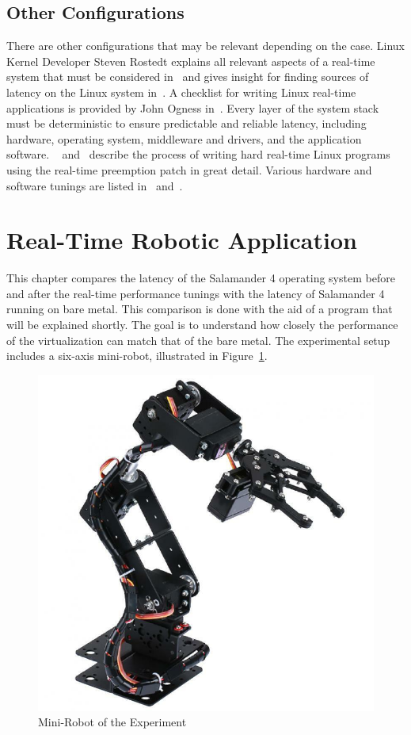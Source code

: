 \documentclass[MMR,Master,english]{style/twbook}
\begin{document}
\subsection{Other Configurations}
There are other configurations that may be relevant depending on the case. Linux Kernel Developer Steven Rostedt explains all relevant aspects of a real-time system that must be considered in~\cite{kernelrecipesKernelRecipes20162016} and gives insight for finding sources of latency on the Linux system in~\cite{thelinuxfoundationFindingSourcesLatency2020}. A checklist for writing Linux real-time applications is provided by John Ogness in~\cite{thelinuxfoundationChecklistWritingLinux2020}. Every layer of the system stack must be deterministic to ensure predictable and reliable latency, including hardware, operating system, middleware and drivers, and the application software. ~\cite{HOWTOBuildRTapplication} and~\cite{RealtimeProgrammingLinux} describe the process of writing hard real-time Linux programs using the real-time preemption patch in great detail. Various hardware and software tunings are listed in~\cite{KVMQemuVirtualization} and~\cite{RealTimePerformanceTuning2022}.

\clearpage

\section{Real-Time Robotic Application}\label{sec:robotic_application}
This chapter compares the latency of the Salamander 4 operating system before and after the real-time performance tunings with the latency of Salamander 4 running on bare metal. This comparison is done with the aid of a program that will be explained shortly. The goal is to understand how closely the performance of the virtualization can match that of the bare metal. The experimental setup includes a six-axis mini-robot, illustrated in Figure~\ref{fig:mini_robot}.

\begin{figure}[H]
	\centering
	\includegraphics[width=0.3\columnwidth]{img/experiment/mini_robot.jpg}
	\caption[Mini-Robot of the Experiment]{Mini-Robot of the Experiment~\cite{6DFRoboticArm}}
	\label{fig:mini_robot}
\end{figure}
\end{document}

